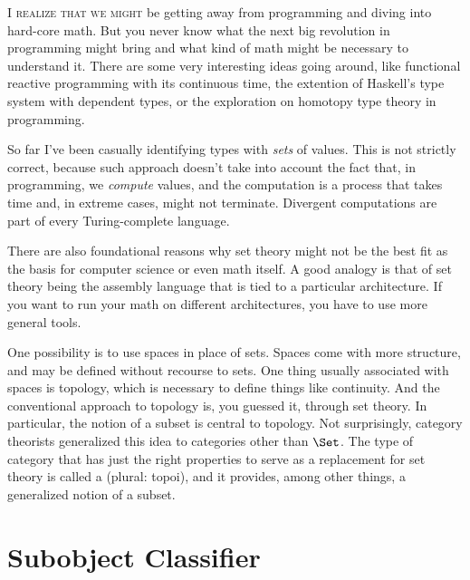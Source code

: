 \lettrine[lhang=0.17]{I}{ realize that we might} be getting away from programming and diving into
hard-core math. But you never know what the next big revolution in
programming might bring and what kind of math might be necessary to
understand it. There are some very interesting ideas going around, like
functional reactive programming with its continuous time, the extention
of Haskell's type system with dependent types, or the exploration on
homotopy type theory in programming.

So far I've been casually identifying types with \emph{sets} of values.
This is not strictly correct, because such approach doesn't take into
account the fact that, in programming, we \emph{compute} values, and the
computation is a process that takes time and, in extreme cases, might
not terminate. Divergent computations are part of every Turing-complete
language.

There are also foundational reasons why set theory might not be the best
fit as the basis for computer science or even math itself. A good
analogy is that of set theory being the assembly language that is tied
to a particular architecture. If you want to run your math on different
architectures, you have to use more general tools.

One possibility is to use spaces in place of sets. Spaces come with more
structure, and may be defined without recourse to sets. One thing
usually associated with spaces is topology, which is necessary to define
things like continuity. And the conventional approach to topology is,
you guessed it, through set theory. In particular, the notion of a
subset is central to topology. Not surprisingly, category theorists
generalized this idea to categories other than $\Set$. The type of
category that has just the right properties to serve as a replacement
for set theory is called a  (plural: topoi), and it
provides, among other things, a generalized notion of a subset.

\section{Subobject Classifier}

